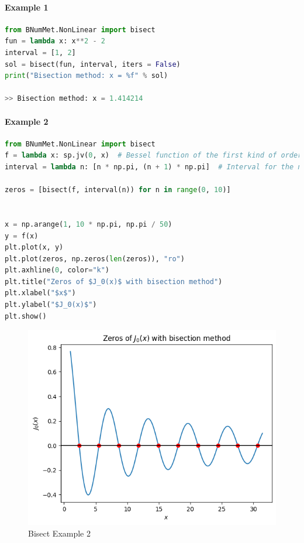 \paragraph{Example 1}{
\begin{lstlisting}[language=Python]
from BNumMet.NonLinear import bisect
fun = lambda x: x**2 - 2
interval = [1, 2]
sol = bisect(fun, interval, iters = False)
print("Bisection method: x = %f" % sol)

>> Bisection method: x = 1.414214
\end{lstlisting}
}
\paragraph{Example 2}{
\begin{lstlisting}[language=Python]
from BNumMet.NonLinear import bisect
f = lambda x: sp.jv(0, x)  # Bessel function of the first kind of order 0
interval = lambda n: [n * np.pi, (n + 1) * np.pi]  # Interval for the n-th zero

zeros = [bisect(f, interval(n)) for n in range(0, 10)]


x = np.arange(1, 10 * np.pi, np.pi / 50)
y = f(x)
plt.plot(x, y)
plt.plot(zeros, np.zeros(len(zeros)), "ro")
plt.axhline(0, color="k")
plt.title("Zeros of $J_0(x)$ with bisection method")
plt.xlabel("$x$")
plt.ylabel("$J_0(x)$")
plt.show()
\end{lstlisting}
\begin{figure}[H]
    \centering
    \includegraphics{Include/Images/Thesis/Documentation/NonLinear/Bisect Example 2.png}
    \caption{Bisect Example 2}
    \label{fig:Bisect Example 2}
\end{figure}
}